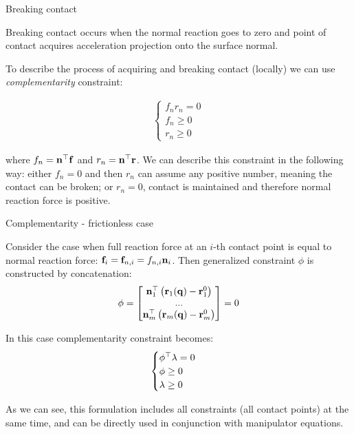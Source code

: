 \documentclass{beamer}
\begin{document}
\begin{frame}{Breaking contact}
	\begin{flushleft}
		
		Breaking contact occurs when the normal reaction goes to zero and point of contact acquires acceleration projection onto the surface normal.
		
		\bigskip
		
		To describe the process of acquiring and breaking contact (locally) we can use \emph{complementarity} constraint:
		
		\begin{align}
			\begin{cases}
				f_n r_n = 0 \\
				f_n \geq 0 \\
				r_n \geq 0
			\end{cases}
		\end{align}
		
		where $f_n = \mathbf{n}^\top\mathbf{f}$ and $r_n =\mathbf{n}^\top\mathbf{r}$. We can describe this constraint in the following way: either $f_n = 0$ and then $r_n$ can assume any positive number, meaning the contact can be broken; or $r_n = 0$, contact is maintained and therefore normal reaction force is positive.
		
	\end{flushleft}
\end{frame}



\begin{frame}{Complementarity - frictionless case}
	\begin{flushleft}
		
		Consider the case when full reaction force at an $i$-th contact point is equal to normal reaction force: $\mathbf{f}_i = \mathbf{f}_{n,i} = f_{n,i} \mathbf{n}_i$. Then generalized constraint $\phi$ is constructed by concatenation:
		\begin{align}
			\phi = \begin{bmatrix}
				\mathbf{n}_1^\top \left(\mathbf{r}_1(\mathbf{q}) - \mathbf{r}_1^0 \right) \\
				... \\
				\mathbf{n}_m^\top \left(\mathbf{r}_m(\mathbf{q}) - \mathbf{r}_m^0 \right)
			\end{bmatrix}
		= 0
		\end{align}
		
		In this case complementarity constraint becomes:
		\begin{align}
			\begin{cases}
				\phi^\top \lambda = 0 \\
				\phi \geq 0 \\
				\lambda \geq 0
			\end{cases}
		\end{align}
		
		As we can see, this formulation includes all constraints (all contact points) at the same time, and can be directly used in conjunction with manipulator equations.
		
	\end{flushleft}
\end{frame}
\end{document}
